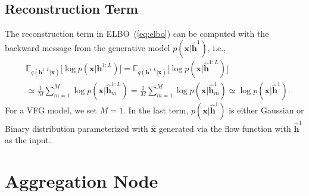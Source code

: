\documentclass{article}
\begin{document}

\subsection{Reconstruction Term}

The reconstruction term in ELBO~(\ref{eq:elbo}) can be computed with the backward message from the generative model $p(\mathbf{x}| \widehat{\mathbf{h}}^{1})$, i.e.,
\begin{align*} 
&\mathbb{E}_{q(\mathbf{h}^{1:L}|\mathbf{x})}\big[ \log p(\mathbf{x}|\mathbf{h}^{1:L})\big]
=\mathbb{E}_{q(\mathbf{h}^{1:L}|\mathbf{x})}\big[ \log p(\mathbf{x}|\widehat{\mathbf{h}}^{1:L})  \big] \\
&\simeq \frac{1}{M}\sum_{m=1}^M \log p(\mathbf{x}| \widehat{\mathbf{h}}^{1:L}_m) = \frac{1}{M}\sum_{m=1}^M \log p(\mathbf{x}| \widehat{\mathbf{h}}^{1}_m) \simeq  \log p(\mathbf{x}| \widehat{\mathbf{h}}^{1}) .
 \end{align*}
For a VFG model, we set $M=1$. In the last term,  $p(\mathbf{x}| \widehat{\mathbf{h}}^{1})$ is either Gaussian or Binary distribution parameterized with $\widehat{\mathbf{x}}$ generated via the flow function with $\widehat{\mathbf{h}}^{1}$ as the input. 



\section{Aggregation Node}
\end{document}
